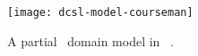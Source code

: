 


\begin{figure}[th]
	\centering
		\label{fig:dcsl_courseman}
		\texttt{[image: dcsl-model-courseman]}
		\caption{A partial \courseman~domain model in \dcsl~\cite{le_domain_2018}.}
\end{figure}

